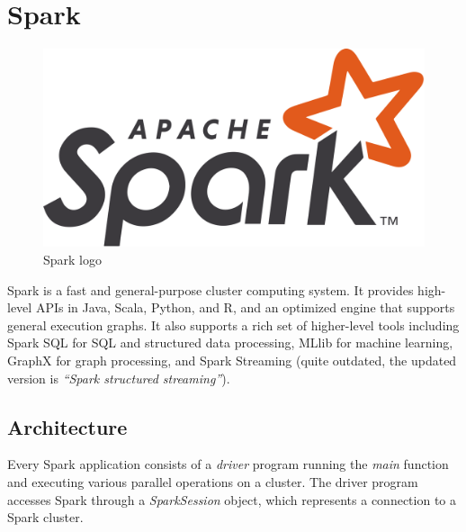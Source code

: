 \section{Spark}
\begin{paracol}{2}
   \begin{figure}[htbp]
      \centering
      \includegraphics{images/14/spark_logo.png}
      \caption{Spark logo}
      \label{fig:14/spark_logo}
   \end{figure}
   \switchcolumn
   Spark is a fast and general-purpose cluster computing system. It provides high-level APIs in Java, Scala, Python, and R, and an optimized engine that supports general execution graphs. It also supports a rich set of higher-level tools including Spark SQL for SQL and structured data processing, MLlib for machine learning, GraphX for graph processing, and Spark Streaming (quite outdated, the updated version is \textit{``Spark structured streaming''}).
\end{paracol}



\subsection{Architecture}
Every Spark application consists of a \textit{driver} program running the \textit{main} function and executing various parallel operations on a cluster. The driver program accesses Spark through a \textit{SparkSession} object, which represents a connection to a Spark cluster.


